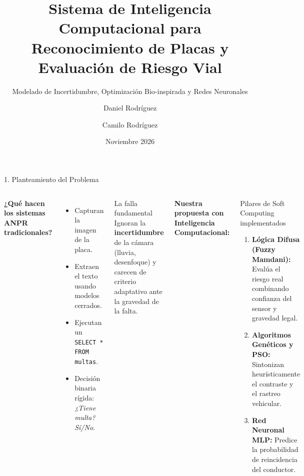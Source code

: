 \documentclass[aspectratio=169, 10pt]{beamer}
\title[ANPR con Inteligencia Computacional]{Sistema de Inteligencia Computacional para Reconocimiento de Placas y Evaluación de Riesgo Vial}
\subtitle{Modelado de Incertidumbre, Optimización Bio-inspirada y Redes Neuronales}
\author[Rodríguez \& Rodríguez]{Daniel Rodríguez \and Camilo Rodríguez}
\institute[UPTC]{
    Programa de Ingeniería de Sistemas\\
    Universidad Pedagógica y Tecnológica de Colombia (UPTC)\\
    Seccional Sogamoso
}
\date{Noviembre 2026}
\begin{document}
\begin{frame}
    \titlepage
\end{frame}

\begin{frame}{1. Planteamiento del Problema}
    \begin{columns}
        \textbf{¿Qué hacen los sistemas ANPR tradicionales?}
        \begin{itemize}
            \item Capturan la imagen de la placa.
            \item Extraen el texto usando modelos cerrados.
            \item Ejecutan un \texttt{SELECT * FROM multas}.
            \item Decisión binaria rígida: \textit{¿Tiene multa? Sí/No}.
        \end{itemize}
        \vspace{0.3cm}
        \begin{alertblock}{La falla fundamental}
            Ignoran la \textbf{incertidumbre} de la cámara (lluvia, desenfoque) y carecen de criterio adaptativo ante la gravedad de la falta.
        \end{alertblock}

        \textbf{Nuestra propuesta con Inteligencia Computacional:}
        \begin{block}{Pilares de Soft Computing implementados}
            \begin{enumerate}
                \item \textbf{Lógica Difusa (Fuzzy Mamdani):} Evalúa el riesgo real combinando confianza del sensor y gravedad legal.
                \item \textbf{Algoritmos Genéticos y PSO:} Sintonizan heurísticamente el contraste y el rastreo vehicular.
                \item \textbf{Red Neuronal MLP:} Predice la probabilidad de reincidencia del conductor.
            \end{enumerate}
        \end{block}
    \end{columns}
\end{frame}
\end{document}
